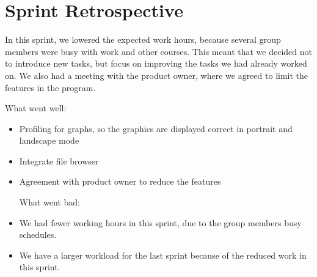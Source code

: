 \section{Sprint Retrospective} %
\label{sec:Sprint Retrospective}

In this sprint, we lowered the expected work hours, because several group members were busy with work and other courses. This meant that we decided not to introduce new tasks, but focus on improving the tasks we had already worked on.
We also had a meeting with the product owner, where we agreed to limit the features in the program.

What went well:

\begin{itemize}
\item Profiling for graphs, so the graphics are displayed correct in portrait and landscape mode

\item Integrate file browser

\item Agreement with product owner to reduce the features

What went bad:

\item We had fewer working hours in this sprint, due to the group members busy schedules.

\item We have a larger workload for the last sprint because of the reduced work in this sprint.

\end{itemize}
